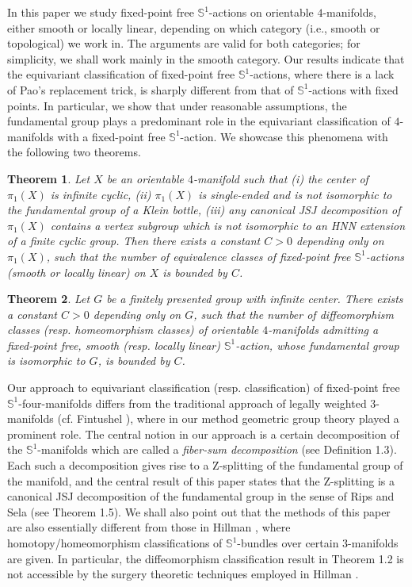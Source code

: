 \documentclass[11pt]{amsart}
\theoremstyle{plain}
\newtheorem{theorem}{Theorem}
\numberwithin{theorem}{section}
\theoremstyle{definition}
\begin{document}
In this paper we study fixed-point free ${{\mathbb S}}^1$-actions on orientable $4$-manifolds, either smooth or 
locally linear, depending on which category (i.e., smooth or topological) we work in. The arguments 
are valid for both categories; for simplicity, we shall work mainly in the smooth category. 
Our results indicate that the equivariant classification of fixed-point free ${{\mathbb S}}^1$-actions, where there is
a lack of Pao's replacement trick, is sharply different from that of ${{\mathbb S}}^1$-actions with fixed points. 
In particular, we show that under reasonable assumptions, the fundamental group plays a predominant 
role in the equivariant classification of $4$-manifolds with a fixed-point free ${{\mathbb S}}^1$-action. We 
showcase this phenomena with the following two theorems. 

\begin{theorem}
Let $X$ be an orientable $4$-manifold such that (i) the center of $\pi_1(X)$ is infinite cyclic,
(ii) $\pi_1(X)$ is single-ended and is not isomorphic to the fundamental group of a Klein bottle, 
(iii) any canonical JSJ decomposition of $\pi_1(X)$ contains a vertex 
subgroup which is not isomorphic to an HNN extension of a finite cyclic group.
Then there exists a constant $C>0$ depending only on $\pi_1(X)$, such that the number of
equivalence classes of fixed-point free ${{\mathbb S}}^1$-actions (smooth or locally linear) on $X$ is bounded by $C$. 
\end{theorem}

\begin{theorem}
Let $G$ be a finitely presented group with infinite center. There exists a constant 
$C>0$ depending only on $G$, such that the number of diffeomorphism classes 
(resp. homeomorphism classes) of orientable $4$-manifolds admitting a fixed-point free, 
smooth (resp. locally linear) ${{\mathbb S}}^1$-action, whose fundamental group is isomorphic to $G$, 
is bounded by $C$. 
\end{theorem}

Our approach to equivariant classification (resp. classification) of fixed-point free ${{\mathbb S}}^1$-four-manifolds
differs from the traditional approach of legally weighted $3$-manifolds (cf. Fintushel \cite{F0,F1,F2}),
where in our method geometric group theory played a prominent role. The central notion in our 
approach is a certain decomposition of the ${{\mathbb S}}^1$-manifolds which are called a {\it fiber-sum 
decomposition} (see Definition 1.3). Each such a decomposition gives rise to a Z-splitting of the 
fundamental group of the manifold, and the central result of this paper states that the Z-splitting is a 
canonical JSJ decomposition of the fundamental group in the sense of Rips and Sela \cite{RipS} 
(see Theorem 1.5). We shall also point out that the methods of this paper are also essentially different
from those in Hillman \cite{Hillman}, where homotopy/homeomorphism classifications of ${{\mathbb S}}^1$-bundles
over certain $3$-manifolds are given. In particular, the diffeomorphism classification result in 
Theorem 1.2 is not accessible by the surgery theoretic techniques employed in Hillman \cite{Hillman}. 
\end{document}
